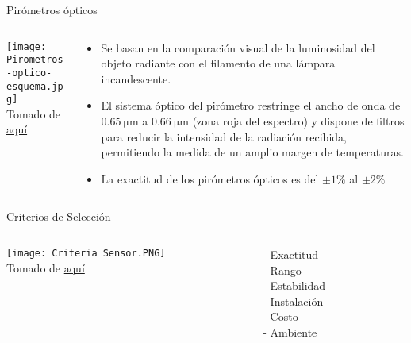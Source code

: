 \documentclass[aspectratio=169]{beamer}
\begin{document}
\begin{frame}{Pirómetros ópticos}
    \begin{columns}[c, onlytextwidth]
        \begin{column}{0.47\textwidth}
            \texttt{[image: Pirometros-optico-esquema.jpg]}
            \\ \tiny{Tomado de \href{https://como-funciona.co/un-pirometro/}{aquí}}
        \end{column}
        \begin{column}{0.50\textwidth}
            \begin{itemize}
                \item Se basan en la comparación visual de la luminosidad del objeto radiante con el filamento de una lámpara incandescente.
                \item El sistema óptico del pirómetro restringe el ancho de onda de $\SI{0.65}{\micro\meter}$ a $\SI{0.66}{\micro\meter}$ (zona roja del espectro) y dispone de filtros para reducir la intensidad de la radiación recibida, permitiendo la medida de un amplio margen de temperaturas. 
                \item La exactitud de los pirómetros ópticos es del $\pm 1\%$ al $\pm2\%$ 
            \end{itemize}
        \end{column}
        
    \end{columns}
\end{frame}
\begin{frame}{Criterios de Selección}
 \begin{columns}[c, onlytextwidth]
        \begin{column}{0.40\textwidth}
        \centering
            \texttt{[image: Criteria Sensor.PNG]}
            \\ \tiny{Tomado de \href{https://www.variohm.com/news-media/technical-blog-archive/selecting-temperature-sensor-things-to-consider}{aquí}}
        \end{column}
        \begin{column}{0.50\textwidth}
               \centering
        {- Exactitud \\
        - Rango \\
        - Estabilidad \\
        - Instalación\\
        - Costo\\
        - Ambiente
        }
        \end{column}
    \end{columns}
\end{frame}
\end{document}
